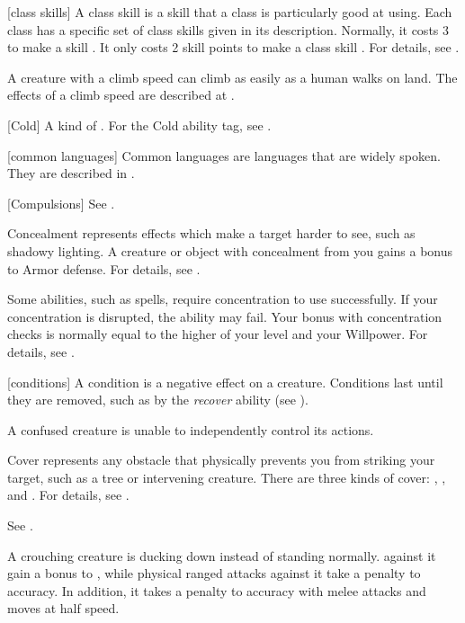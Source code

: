 [class skills] A class skill is a skill that a class is particularly good at using.
Each class has a specific set of class skills given in its description.
Normally, it costs 3  to make a skill .
It only costs 2 skill points to make a class skill .
For details, see .

 A creature with a climb speed can climb as easily as a human walks on land.
The effects of a climb speed are described at .

[Cold] A kind of . For the Cold ability tag, see .

[common languages] Common languages are languages that are widely spoken.
They are described in .

[Compulsions] See .

 Concealment represents effects which make a target harder to see, such as shadowy lighting.
A creature or object with concealment from you gains a  bonus to Armor defense.
For details, see .

 Some abilities, such as spells, require concentration to use successfully.
If your concentration is disrupted, the ability may fail.
Your bonus with concentration checks is normally equal to the higher of your level and your Willpower.
For details, see .

[conditions] A condition is a negative effect on a creature.
Conditions last until they are removed, such as by the \textit{recover} ability (see ).

 A confused creature is unable to independently control its actions. \confusionexplanation

 Cover represents any obstacle that physically prevents you from striking your target, such as a tree or intervening creature.
There are three kinds of cover: , , and .
For details, see .

 See .

 A crouching creature is ducking down instead of standing normally.
 against it gain a  bonus to , while physical ranged attacks against it take a  penalty to accuracy.
In addition, it takes a  penalty to accuracy with melee attacks and moves at half speed.

